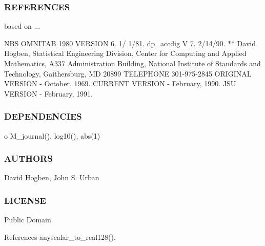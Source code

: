 \subsubsection*{R\+E\+F\+E\+R\+E\+N\+C\+ES}

based on ...

N\+BS O\+M\+N\+I\+T\+AB 1980 V\+E\+R\+S\+I\+ON 6. 1/ 1/81. dp\+\_\+accdig V 7. 2/14/90. $\ast$$\ast$ David Hogben, Statistical Engineering Division, Center for Computing and Applied Mathematics, A337 Administration Building, National Institute of Standards and Technology, Gaithersburg, MD 20899 T\+E\+L\+E\+P\+H\+O\+NE 301-\/975-\/2845 O\+R\+I\+G\+I\+N\+AL V\+E\+R\+S\+I\+ON -\/ October, 1969. C\+U\+R\+R\+E\+NT V\+E\+R\+S\+I\+ON -\/ February, 1990. J\+SU V\+E\+R\+S\+I\+ON -\/ February, 1991.

\subsubsection*{D\+E\+P\+E\+N\+D\+E\+N\+C\+I\+ES}

o M\+\_\+journal(), log10(), abs(1)

\subsubsection*{A\+U\+T\+H\+O\+RS}

David Hogben, John S. Urban

\subsubsection*{L\+I\+C\+E\+N\+SE}

Public Domain 

References anyscalar\+\_\+to\+\_\+real128().

